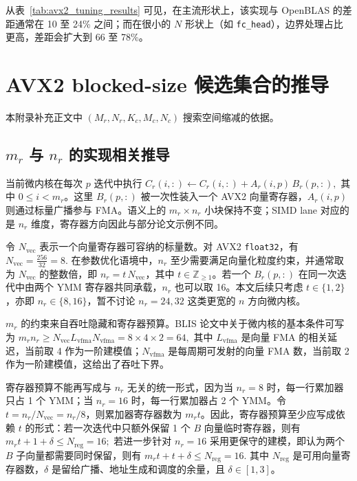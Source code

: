\documentclass[a4paper,11pt,oneside]{article}
\begin{document}
从表~\ref{tab:avx2_tuning_results} 可见，在主流形状上，该实现与 OpenBLAS 的差距通常在 10 至 24\% 之间；而在很小的 $N$ 形状上（如 \texttt{fc\_head}），边界处理占比更高，差距会扩大到 66 至 78\%。

\section{AVX2 blocked-size 候选集合的推导}\label{app:blocked_size_tuning}

本附录补充正文中 $(M_r,N_r,K_c,M_c,N_c)$ 搜索空间缩减的依据。

\subsection{$m_r$ 与 $n_r$ 的实现相关推导}

当前微内核在每次 $p$ 迭代中执行
$
C_r(i,:) \leftarrow C_r(i,:) + A_r(i,p)\,B_r(p,:),
$
其中 $0 \le i < m_r$。这里 $B_r(p,:)$ 被一次性装入一个 AVX2 向量寄存器，$A_r(i,p)$ 则通过标量广播参与 FMA。语义上的 $m_r \times n_r$ 小块保持不变；SIMD lane 对应的是 $n_r$ 维度，寄存器方向因此与部分论文示例不同。

令 $N_{\text{vec}}$ 表示一个向量寄存器可容纳的标量数。对 AVX2 \texttt{float32}，有
$
N_{\text{vec}} = \frac{256}{32} = 8.
$
在参数优化语境中，$n_r$ 至少需要满足向量化粒度约束，并通常取为 $N_{\text{vec}}$ 的整数倍，即 $n_r = t\,N_{\text{vec}}$，其中 $t \in \mathbb{Z}_{\ge 1}$。若一个 $B_r(p,:)$ 在同一次迭代中由两个 YMM 寄存器共同承载，$n_r$ 也可以取 16。本文后续只考虑 $t \in \{1,2\}$，亦即 $n_r \in \{8,16\}$，暂不讨论 $n_r = 24,32$ 这类更宽的 $n$ 方向微内核。

$m_r$ 的约束来自吞吐隐藏和寄存器预算。BLIS 论文中关于微内核的基本条件可写为
$
m_r n_r \ge N_{\text{vec}} L_{\text{vfma}} N_{\text{vfma}} = 8 \times 4 \times 2 = 64,
$
其中 $L_{\text{vfma}}$ 是向量 FMA 的相关延迟，当前取 4 作为一阶建模值；$N_{\text{vfma}}$ 是每周期可发射的向量 FMA 数，当前取 2 作为一阶建模值，这给出了吞吐下界。

寄存器预算不能再写成与 $n_r$ 无关的统一形式，因为当 $n_r = 8$ 时，每一行累加器只占 1 个 YMM；当 $n_r = 16$ 时，每一行累加器占 2 个 YMM。令 $t = n_r / N_{\text{vec}} = n_r / 8$，则累加器寄存器数为 $m_r t$。因此，寄存器预算至少应写成依赖 $t$ 的形式：若一次迭代中只额外保留 1 个 $B$ 向量临时寄存器，则有
$
m_r t + 1 + \delta \le N_{\text{reg}} = 16;
$
若进一步针对 $n_r = 16$ 采用更保守的建模，即认为两个 $B$ 子向量都需要同时保留，则有
$
m_r t + t + \delta \le N_{\text{reg}} = 16.
$
其中 $N_{\text{reg}}$ 是可用向量寄存器数，$\delta$ 是留给广播、地址生成和调度的余量，且 $\delta \in [1,3]$。
\end{document}
